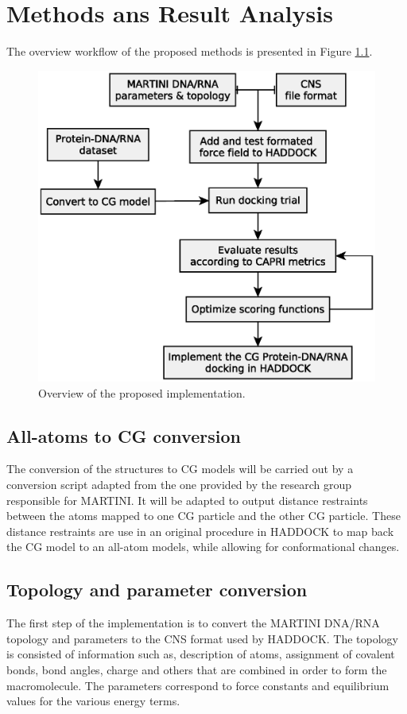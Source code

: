 \documentclass[
	12pt,				%
	openright,			%
	twoside,			%
	a4paper,			%
	english,			%
	french,				%
	spanish,			%
	brazil,				%
	]{abntex2}
\begin{document}

\chapter{Methods ans Result Analysis}


The overview workflow of the proposed methods is presented in Figure \ref{fig:flow}.

\begin{figure}[h]
	\centering
	\includegraphics[width=0.7\linewidth]{figures/flow}
	\caption{Overview of the proposed implementation.}
	\label{fig:flow}
\end{figure}

\section{All-atoms to CG conversion}

The conversion of the structures to CG models will be carried out by a conversion script adapted from the one provided by the research group responsible for MARTINI. It will be adapted to output distance restraints between the atoms mapped to one CG particle and the other CG particle. These distance restraints are use in an original procedure in HADDOCK to map back the CG model to an all-atom models, while allowing for conformational changes.

\section{Topology and parameter conversion}

The first step of the implementation is to convert the MARTINI DNA/RNA topology and parameters to the CNS format used by HADDOCK. The topology is consisted of information such as, description of atoms, assignment of covalent bonds, bond angles, charge and others that are combined in order to form the macromolecule. The parameters correspond to force constants and equilibrium values for the various energy terms.
\end{document}
